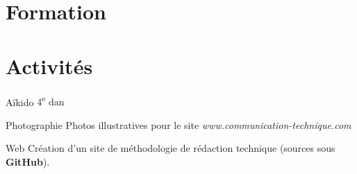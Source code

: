 \documentclass[12pt,a4paper,roman]{moderncv}
\begin{document}
\section{Formation}



\section{Activités}

\cvitem
    {Aïkido}
    {4\textsuperscript{e} dan}

\cvitem
    {Photographie}
    {Photos illustratives pour le site \textit{www.communication-technique.com}}

\cvitem
    {Web}
    {Création d'un site de méthodologie de rédaction technique (sources sous
      \textbf{GitHub}).}
\end{document}

